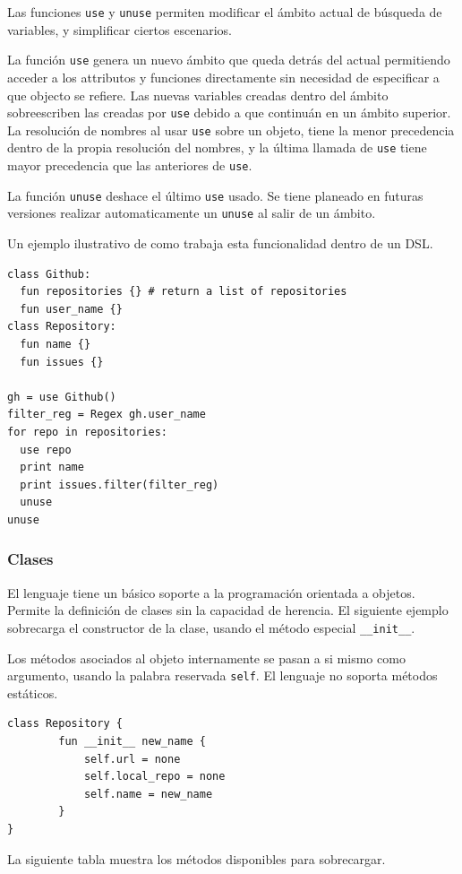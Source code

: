 \documentclass[11pt]{article}
\begin{document}
Las funciones \texttt{use} y \texttt{unuse} permiten modificar el ámbito actual de búsqueda de variables, y simplificar ciertos escenarios.

La función \texttt{use} genera un nuevo ámbito que queda detrás del actual permitiendo acceder a los attributos y funciones directamente
sin necesidad de especificar a que objecto se refiere. Las nuevas variables creadas dentro del ámbito sobreescriben las creadas por \texttt{use}
debido a que continuán en un ámbito superior. La resolución de nombres al usar \texttt{use} sobre un objeto, tiene la menor precedencia
dentro de la propia resolución del nombres, y la última llamada de \texttt{use} tiene mayor precedencia que las anteriores de \texttt{use}.

La función \texttt{unuse} deshace el último \texttt{use} usado. Se tiene planeado en futuras versiones realizar automaticamente un \texttt{unuse} al salir de un ámbito.

Un ejemplo ilustrativo de como trabaja esta funcionalidad dentro de un DSL.

\begin{verbatim}
class Github:
  fun repositories {} # return a list of repositories
  fun user_name {}
class Repository:
  fun name {}
  fun issues {}

gh = use Github()
filter_reg = Regex gh.user_name
for repo in repositories:
  use repo
  print name
  print issues.filter(filter_reg)
  unuse
unuse
\end{verbatim}

\subsubsection{Clases}
\label{sec:org040aad2}
El lenguaje tiene un básico soporte a la programación orientada a objetos. Permite la definición
de clases sin la capacidad de herencia. El siguiente ejemplo sobrecarga el constructor de la clase,
usando el método especial \texttt{\_\_init\_\_}.

Los métodos asociados al objeto internamente se pasan a si mismo como argumento, usando la palabra
reservada \texttt{self}. El lenguaje no soporta métodos estáticos.


\begin{verbatim}
class Repository {
        fun __init__ new_name {
            self.url = none
            self.local_repo = none
            self.name = new_name
        }
}
\end{verbatim}

La siguiente tabla muestra los métodos disponibles para sobrecargar.
\end{document}
